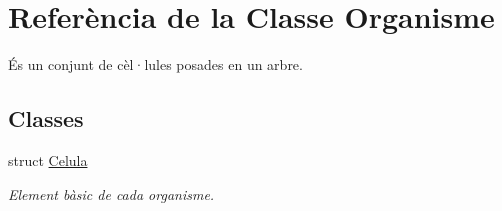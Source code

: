 \hypertarget{class_organisme}{\section{Referència de la Classe Organisme}
\label{class_organisme}
}


És un conjunt de cèl·lules posades en un arbre.  


\subsection*{Classes}
\begin{DoxyCompactItemize}
\item 
struct \hyperlink{struct_organisme_1_1_celula}{Celula}
\begin{DoxyCompactList}\small\item\em Element bàsic de cada organisme. \end{DoxyCompactList}\end{DoxyCompactItemize}
